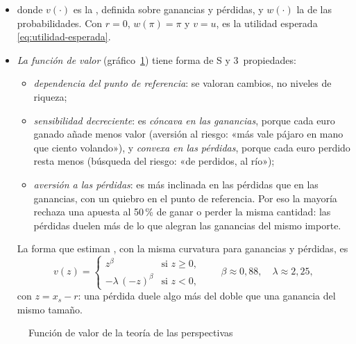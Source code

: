\documentclass[11pt]{article}
\begin{document}
\begin{itemize}
\item[] donde $v(\cdot)$ es la , definida sobre ganancias y pérdidas, y $w(\cdot)$ la  de las probabilidades. Con $r=0$, $w(\pi)=\pi$ y $v=u$, es la utilidad esperada \eqref{eq:utilidad-esperada}.
\item \emph{La función de valor} (gráfico~\ref{fig:funcion-valor}) tiene forma de S y 3~propiedades:
  \begin{itemize}
  \item \emph{dependencia del punto de referencia}: se valoran cambios, no niveles de riqueza;
  \item \emph{sensibilidad decreciente}: es \emph{cóncava en las ganancias}, porque cada euro ganado añade menos valor (aversión al riesgo: «más vale pájaro en mano que ciento volando»), y \emph{convexa en las pérdidas}, porque cada euro perdido resta menos (búsqueda del riesgo: «de perdidos, al río»);
  \item \emph{aversión a las pérdidas}: es más inclinada en las pérdidas que en las ganancias, con un quiebro en el punto de referencia. Por eso la mayoría rechaza una apuesta al 50\,\% de ganar o perder la misma cantidad: las pérdidas duelen más de lo que alegran las ganancias del mismo importe.
  \end{itemize}
  La forma que estiman \textcite{TverskyKahneman1992Advances}, con la misma curvatura para ganancias y pérdidas, es
  \begin{equation}\label{eq:funcion-valor}
  v(z)=\begin{cases} z^{\beta} & \text{si } z\geq 0,\\ -\lambda\,(-z)^{\beta} & \text{si } z<0,\end{cases}\qquad \beta\approx 0{,}88,\quad \lambda\approx 2{,}25 ,
  \end{equation}
  con $z=x_s-r$: una pérdida duele algo más del doble que una ganancia del mismo tamaño.
\end{itemize}

\begin{figure}[H]
\centering
\caption{Función de valor de la teoría de las perspectivas}\label{fig:funcion-valor}
\end{figure}
\end{document}
